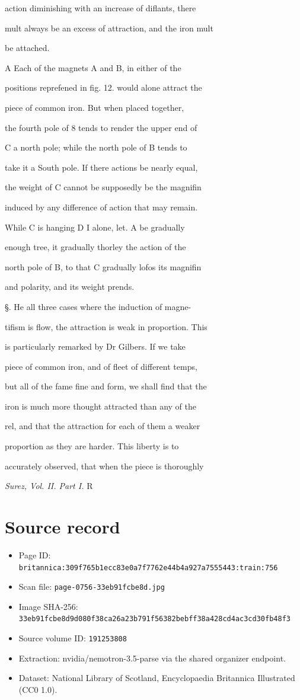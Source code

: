 \documentclass{article}
\begin{document}
action diminishing with an increase of diflants, there

mult always be an excess of attraction, and the iron mult

be attached.

A Each of the magnets A and B, in either of the

positions reprefened in fig. 12. would alone attract the

piece of common iron. But when placed together,

the fourth pole of 8 tends to render the upper end of

C a north pole; while the north pole of B tends to

take it a South pole. If there actions be nearly equal,

the weight of C cannot be supposedly be the magnifin

induced by any difference of action that may remain.

While C is hanging D I alone, let. A be gradually

enough tree, it gradually thorley the action of the

north pole of B, to that C gradually lofos its magnifin

and polarity, and its weight prends.

§. He all three cases where the induction of magne-

tifism is flow, the attraction is weak in proportion. This

is particularly remarked by Dr Gilbers. If we take

piece of common iron, and of fleet of different temps,

but all of the fame fine and form, we shall find that the

iron is much more thought attracted than any of the

rel, and that the attraction for each of them a weaker

proportion as they are harder. This liberty is to

accurately observed, that when the piece is thoroughly

\textit{Surez, Vol. II. Part I.}
R

\section*{Source record}
\begin{itemize}
\item Page ID: \texttt{britannica:309f765b1ecc83e0a7f7762e44b4a927a7555443:train:756}
\item Scan file: \texttt{page-0756-33eb91fcbe8d.jpg}
\item Image SHA-256: \texttt{33eb91fcbe8d9d080f38ca26a23b791f56382bebff38a428cd4ac3cd30fb48f3}
\item Source volume ID: \texttt{191253808}
\item Extraction: nvidia/nemotron-3.5-parse via the shared organizer endpoint.
\item Dataset: National Library of Scotland, Encyclopaedia Britannica Illustrated (CC0 1.0).
\end{itemize}
\end{document}
